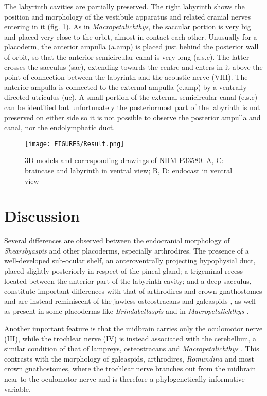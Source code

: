 \documentclass[11pt,letterpaper]{report}
\begin{document}
The labyrinth cavities are partially preserved. The right labyrinth shows the position and morphology of the vestibule apparatus and related cranial nerves entering in it (fig. \ref{shearsby3d}). As in \textit{Macropetalichthys}, the saccular portion is very big and placed very close to the orbit, almost in contact each other. Unusually for a placoderm, the anterior ampulla (a.amp) is placed just behind the posterior wall of orbit, so that the anterior semicircular canal is very long (a.s.c). The latter crosses the sacculus (sac), extending towards the centre and enters in it above the point of connection between the labyrinth and the acoustic nerve (VIII). The anterior ampulla is connected to the external ampulla (e.amp) by a ventrally directed utriculus (uc). A small portion of the external semicircular canal (e.s.c) can be identified but unfortunately the posteriormost part of the labyrinth is not preserved on either side so it is not possible to observe the posterior ampulla and canal, nor the endolymphatic duct.

\begin{figure}[!h]
\centering
    \texttt{[image: FIGURES/Result.png]}
\caption{\footnotesize{3D models and corresponding drawings of NHM P33580. A, C: braincase and labyrinth in ventral view; B, D: endocast in ventral view}}
\label{shearsby3d}
\end{figure}

\section{Discussion}

Several differences are observed between the endocranial morphology of \textit{Shearsbyaspis} and other placoderms, especially arthrodires. The presence of a well-developed sub-ocular shelf, an anteroventrally projecting hypophysial duct, placed slightly posteriorly in respect of the pineal gland; a trigeminal recess located between the anterior part of the labyrinth cavity; and a deep sacculus, constitute important differences with that of arthrodires and crown gnathostomes and are instead reminiscent of the jawless osteostracans \citep{Janvier1985,Janvier1996a,brazeau2009braincase,brazeau2014characters,Janvier2015} and galeaspids \citep{Gai2011}, as well as present in some placoderms like \textit{Brindabellaspis} \citep{Young1980} and in \textit{Macropetalichthys} \citep{Stensi1925,Stensi1963b,Stensi1969}.

Another important feature is that the midbrain carries only the oculomotor nerve (III), while the trochlear nerve (IV) is instead associated with the cerebellum, a similar condition of that of lampreys, osteostracans and \textit{Macropetalichthys} \citep{Nieuwenhuys1977,Janvier2008,Stensi1963a,Stensi1969}. This contrasts with the morphology of galeaspids, arthrodires, \textit{Romundina} and most crown gnathostomes, where the trochlear nerve branches out from the midbrain near to the oculomotor nerve \citep{Goujet1984a,Elliott2010,Pradel2010,Gai2011,Dupret2014,giles2014virtual} and is therefore a phylogenetically informative variable.
\end{document}
